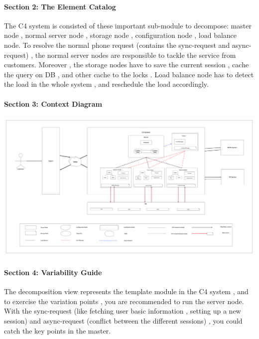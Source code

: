 \documentclass{article}
\begin{document}
			\paragraph{Section 2: The Element Catalog}
			The C4 system is consisted of these important sub-module to decompose:  master node , normal server node , storage node , configuration node , load balance node. To resolve the normal phone request (contains the sync-request and async-request) , the normal server nodes are responsible to tackle the service from customers. Moreover , the storage nodes have to save the current session , cache the query on DB , and other cache to the locks . Load balance node has to detect the load in the whole system , and reschedule the load accordingly. 
			\paragraph{Section 3: Context Diagram}
			\begin{center}
			\includegraphics[scale=0.05]{decom_section2.png}
			\end{center}
			\paragraph{Section 4: Variability Guide}
			The decomposition view represents the template module in the C4 system , and to exercise the variation points , you are recommended to run the server node. With the sync-request (like fetching user basic information , setting up a new session)  and async-request (conflict between the different sessions) , you could catch the key points in the master.
\end{document}
